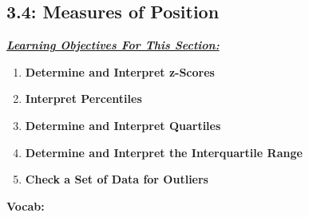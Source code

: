 \documentclass{report}
\begin{document}
         \pagebreak \bigbreak \noindent
         \subsection{3.4: Measures of Position }
         \bigbreak \noindent 
         \textbf{\textit{\underline{Learning Objectives For This Section:}}}
         \begin{enumerate}
             \item \textbf{Determine and Interpret z-Scores}
             \item \textbf{Interpret Percentiles}
             \item \textbf{Determine and Interpret Quartiles}
             \item \textbf{Determine and Interpret the Interquartile Range}
             \item \textbf{Check a Set of Data for Outliers}
         \end{enumerate}
         \bigbreak \noindent 
         \textbf{Vocab:}
\end{document}

